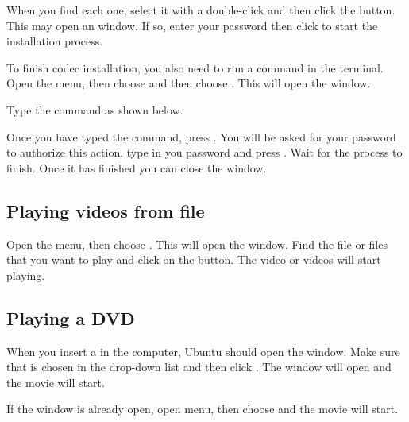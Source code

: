 When you find each one, select it with a double-click and then click the  
button. This may open an  window. If so, enter your password then click  to start the installation process.  

To finish codec installation, you also need to run a command in the terminal.
Open the  menu, then choose  
and then choose . This will open the  window.

Type the command as shown below.

\begin{terminal}
\prompt {}
\end{terminal}

Once you have typed the command, press . You will be asked for 
your password \dash to authorize this action, type in you password and press
. Wait for the process to finish. Once it has finished you can close the  window.

\subsection{Playing videos from file}

Open the  menu, then choose . This will open the 
 window. Find the file or files that you want 
to play and click on the  button. The video or videos will start 
playing.

\subsection{Playing a DVD}

When you insert a  in the computer, Ubuntu should open the  window. Make 
sure that  is chosen in the drop-down list and then 
click . The  window will open and the movie 
will start.

If the  window is already open, open  menu, then 
choose  and the movie will start.
